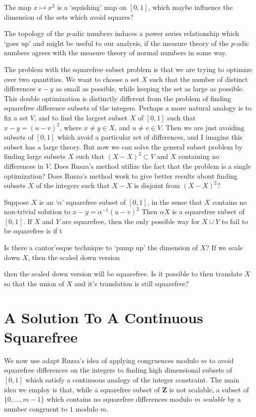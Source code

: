 \documentclass{article}
\theoremstyle{plain}
\theoremstyle{plain}
\begin{document}
The map $x \mapsto x^2$ is a `squishing' map on $[0,1]$, which maybe influence the dimension of the sets which avoid squares?

The topology of the $p$-adic numbers induces a power series relationship which `goes up' and might be useful to our analysis, if the measure theory of the $p$-adic numbers agrees with the measure theory of normal numbers in some way.

The problem with the squarefree subset problem is that we are trying to optimize over two quantities. We want to choose a set $X$ such that the number of distinct differences $x - y$ as small as possible, while keeping the set as large as possible. This double optimization is distinctly different from the problem of finding squarefree difference subsets of the integers. Perhaps a more natural analogy is to fix a set $V$, and to find the largest subset $X$ of $[0,1]$ such that $x - y = (u - v)^2$, where $x \neq y \in X$, and $u \neq v \in V$. Then we are just avoiding subsets of $[0,1]$ which avoid a particular set of differences, and I imagine this subset has a large theory. But now we can solve the general subset problem by finding large subsets $X$ such that $(X - X)^2 \subset V$ and $X$ containing no differences in $V$. Does Rusza's method utilize the fact that the problem is a single optimization? Does Rusza's method work to give better results about finding subsets $X$ of the integers such that $X - X$ is disjoint from $(X - X)^2$?

Suppose $X$ is an `$\alpha$' squarefree subset of $[0,1]$, in the sense that $X$ contains no non-trivial solution to
%
$x - y = \alpha^{-1}(u-v)^2$
%
Then $\alpha X$ is a squarefree subset of $[0,1]$. If $X$ and $Y$ are squarefree, then the only possible way for $X \cup Y$ to fail to be squarefree is if t

Is there a cantor'esque technique to `pump up' the dimension of $X$? If we scale down $X$, then the scaled down version

then the scaled down version will be squarefree. Is it possible to then translate $X$ so that the union of $X$ and it's translation is still squarefree?

\section{A Solution To A Continuous Squarefree}

We now use adapt Ruzsa's idea of applying congruences modulo $m$ to avoid squarefree differences on the integers to finding high dimensional subsets of $[0,1]$ which satisfy a continuous analogy of the integer constraint. The main idea we employ is that, while a squarefree subset of $\mathbf{Z}$ is not scalable, a subset of $\{ 0, \dots, m-1 \}$ which contains no squarefree differences modulo $m$ {\it scalable} by a number congruent to $1$ modulo $m$.
\end{document}
